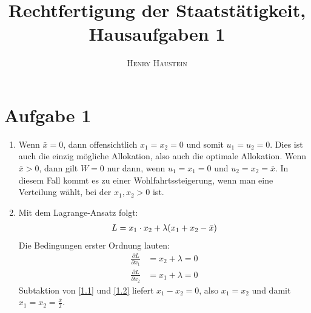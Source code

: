 \documentclass{article}
\title{\textbf{Rechtfertigung der Staatstätigkeit, Hausaufgaben 1}}
\author{\textsc{Henry Haustein}}
\date{}
\begin{document}
	\maketitle
	
	\section*{Aufgabe 1}
	\begin{enumerate}[label=(\alph*)]
		\item Wenn $\bar{x}=0$, dann offensichtlich $x_1=x_2=0$ und somit $u_1=u_2=0$. Dies ist auch die einzig mögliche Allokation, also auch die optimale Allokation. Wenn $\bar{x}>0$, dann gilt $W=0$ nur dann, wenn $u_1=x_1=0$ und $u_2=x_2=\bar{x}$. In diesem Fall kommt es zu einer Wohlfahrtssteigerung, wenn man eine Verteilung wählt, bei der $x_1,x_2>0$ ist.
		\item Mit dem Lagrange-Ansatz folgt:
		\begin{align}
			L = x_1\cdot x_2 + \lambda(x_1+x_2-\bar{x}) \notag
		\end{align}
		Die Bedingungen erster Ordnung lauten:
		\begin{align}
			\label{1.1}
			\frac{\partial L}{\partial x_1} &= x_2 + \lambda = 0 \tag{1.1} \\
			\label{1.2}
			\frac{\partial L}{\partial x_2} &= x_1 + \lambda = 0 \tag{1.2}
		\end{align}
		Subtaktion von \eqref{1.1} und \eqref{1.2} liefert $x_1-x_2=0$, also $x_1=x_2$ und damit $x_1=x_2=\frac{\bar{x}}{2}$.
	\end{enumerate}
\end{document}
